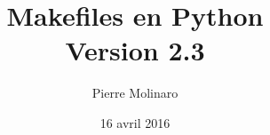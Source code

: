 \documentclass[a4paper,11pt]{extarticle}
\begin{document}
 


\title{\bf \Huge{Makefiles en Python\\Version 2.3}}
\author{Pierre Molinaro}
\date {16 avril 2016}

\maketitle


\tableofcontents

\end{document}
